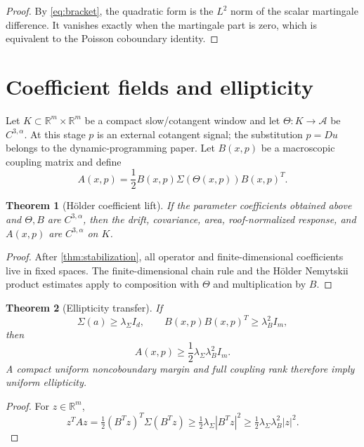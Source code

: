 \documentclass[11pt,reqno]{amsart}
\newtheorem{theorem}{Theorem}[section]
\theoremstyle{definition}
\theoremstyle{remark}
\newcommand{\A}{\mathcal A}
\newcommand{\R}{\mathbb R}
\newcommand{\abs}[1]{\left\lvert #1\right\rvert}
\begin{document}
\begin{proof}
By \eqref{eq:bracket}, the quadratic form is the $L^2$ norm of the scalar
martingale difference.  It vanishes exactly when the martingale part is zero,
which is equivalent to the Poisson coboundary identity.
\end{proof}

\section{Coefficient fields and ellipticity}\label{sec:coefficients}

Let $K\subset\R^m\times\R^m$ be a compact slow/cotangent window and let
$\Theta:K\to\A$ be $C^{3,\alpha}$.  At this stage $p$ is an external cotangent
signal; the substitution $p=Du$ belongs to the dynamic-programming paper.  Let
$B(x,p)$ be a macroscopic coupling matrix and define
\begin{equation}\label{eq:Afield}
 A(x,p)=\frac12B(x,p)\Sigma(\Theta(x,p))B(x,p)^T.
\end{equation}

\begin{theorem}[Hölder coefficient lift]\label{thm:lift}
If the parameter coefficients obtained above and $\Theta,B$ are
$C^{3,\alpha}$, then the drift, covariance, area, roof-normalized response, and
$A(x,p)$ are $C^{3,\alpha}$ on $K$.
\end{theorem}

\begin{proof}
After \cref{thm:stabilization}, all operator and finite-dimensional
coefficients live in fixed spaces.  The finite-dimensional chain rule and the
Hölder Nemytskii product estimates apply to composition with $\Theta$ and
multiplication by $B$.
\end{proof}

\begin{theorem}[Ellipticity transfer]\label{thm:ellipticity}
If
\[
 \Sigma(a)\ge\lambda_\Sigma I_d,
 \qquad
 B(x,p)B(x,p)^T\ge\lambda_B^2I_m,
\]
then
\begin{equation}\label{eq:ellipticity}
 A(x,p)\ge\frac12\lambda_\Sigma\lambda_B^2I_m.
\end{equation}
A compact uniform noncoboundary margin and full coupling rank therefore imply
uniform ellipticity.
\end{theorem}

\begin{proof}
For $z\in\R^m$,
\[
 z^TAz=\tfrac12(B^Tz)^T\Sigma(B^Tz)
 \ge\tfrac12\lambda_\Sigma\abs{B^Tz}^2
 \ge\tfrac12\lambda_\Sigma\lambda_B^2\abs z^2.
\]
\end{proof}
\end{document}
